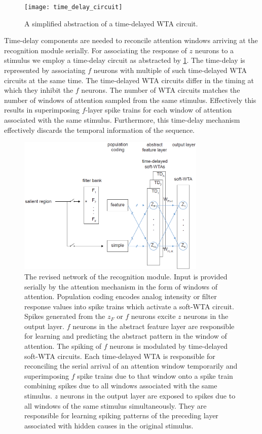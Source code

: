 \documentclass{report}
\begin{document}
\begin{figure}[ht]
\centering
\texttt{[image: time\_delay\_circuit]}
\caption{A simplified abstraction of a time-delayed WTA circuit.
\label{fig:time_delay_circuit}}
\end{figure}

Time-delay components are needed to reconcile attention windows arriving at the recognition module serially. For associating the response of $z$ neurons to a stimulus we employ a time-delay circuit as abstracted by \cref{fig:time_delay_circuit}. The time-delay is represented by associating $f$ neurons with multiple of such time-delayed WTA circuits at the same time. The time-delayed WTA circuits differ in the timing at which they inhibit the $f$ neurons. The number of WTA circuits matches the number of windows of attention sampled from the same stimulus. Effectively this results in superimposing $f$-layer spike trains for each window of attention associated with the same stimulus. Furthermore, this time-delay mechanism effectively discards the temporal information of the sequence.\\

\begin{figure}[ht]
\centering
\includegraphics[width=0.8\textwidth]{network}
\caption{The revised network of the recognition module. Input is provided serially by the attention mechanism in the form of windows of attention. Population coding encodes analog intensity or filter response values into spike trains which activate a soft-WTA circuit. Spikes generated from the $z_F$ or $f$ neurons excite $z$ neurons in the output layer. $f$ neurons in the abstract feature layer are responsible for learning and predicting the abstract pattern in the window of attention. The spiking of $f$ neurons is modulated by time-delayed soft-WTA circuits. Each time-delayed WTA is responsible for reconciling the serial arrival of an attention window temporarily and superimposing $f$ spike trains due to that window onto a spike train combining spikes due to all windows associated with the same stimulus. $z$ neurons in the output layer are exposed to spikes due to all windows of the same stimulus simultaneously. They are responsible for learning spiking patterns of the preceding layer associated with hidden causes in the original stimulus.
\label{fig:network}}
\end{figure}
\end{document}
